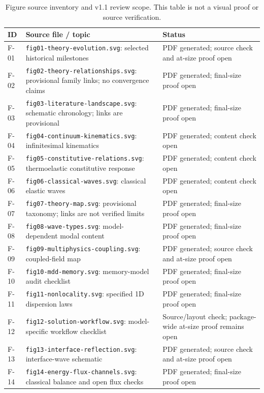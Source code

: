 \begin{table}[htbp]
\centering
\small
\caption{Figure source inventory and v1.1 review scope. This table is not a visual proof or source verification.}
\label{tab:appD-figures}
\begin{tabularx}{\textwidth}{@{}p{2.6cm}X p{2.4cm}@{}}
\toprule
\textbf{ID} & \textbf{Source file / topic} & \textbf{Status} \\
\midrule
F-01 & \texttt{fig01-theory-evolution.svg}: selected historical milestones & PDF generated; source check and at-size proof open \\
F-02 & \texttt{fig02-theory-relationships.svg}: provisional family links; no convergence claims & PDF generated; final-size proof open \\
F-03 & \texttt{fig03-literature-landscape.svg}: schematic chronology; links are provisional & PDF generated; final-size proof open \\
F-04 & \texttt{fig04-continuum-kinematics.svg}: infinitesimal kinematics & PDF generated; content check open \\
F-05 & \texttt{fig05-constitutive-relations.svg}: thermoelastic constitutive response & PDF generated; content check open \\
F-06 & \texttt{fig06-classical-waves.svg}: classical elastic waves & PDF generated; content check open \\
F-07 & \texttt{fig07-theory-map.svg}: provisional taxonomy; links are not verified limits & PDF generated; final-size proof open \\
F-08 & \texttt{fig08-wave-types.svg}: model-dependent modal content & PDF generated; final-size proof open \\
F-09 & \texttt{fig09-multiphysics-coupling.svg}: coupled-field map & PDF generated; source check and at-size proof open \\
F-10 & \texttt{fig10-mdd-memory.svg}: memory-model audit checklist & PDF generated; final-size proof open \\
F-11 & \texttt{fig11-nonlocality.svg}: specified 1D dispersion laws & PDF generated; final-size proof open \\
F-12 & \texttt{fig12-solution-workflow.svg}: model-specific workflow checklist & Source/layout check; package-wide at-size proof remains open \\
F-13 & \texttt{fig13-interface-reflection.svg}: interface-wave schematic & PDF generated; source check and at-size proof open \\
F-14 & \texttt{fig14-energy-flux-channels.svg}: classical balance and open flux checks & PDF generated; final-size proof open \\

\end{tabularx}
\end{table}
